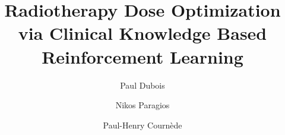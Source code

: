 \documentclass[11pt,twocolumn,twoside]{article}
\begin{document}
\title{Radiotherapy Dose Optimization via Clinical Knowledge Based Reinforcement Learning}

\author[1,2]{Paul Dubois}
\author[1]{Nikos Paragios}
\author[2]{Paul-Henry Cournède}




\maketitle
\thispagestyle{fancy}





\begin{customabstract}
	
\end{customabstract}







 
\end{document}
